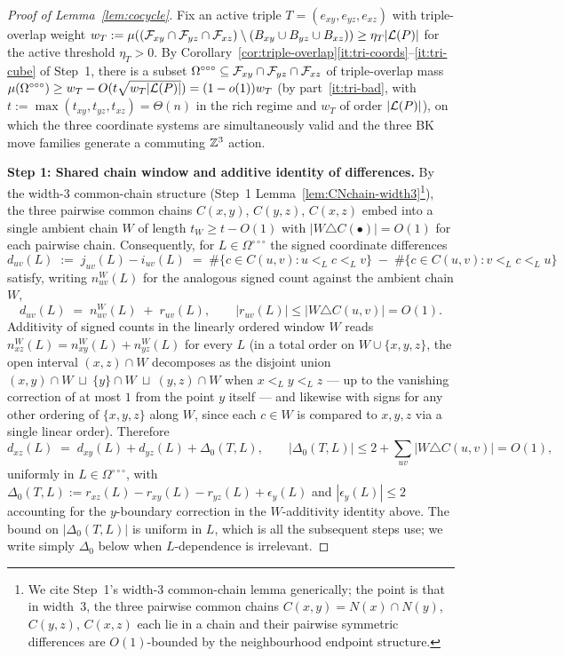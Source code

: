 \begin{proof}[Proof of Lemma~\ref{lem:cocycle}]
Fix an active triple $T=(e_{xy},e_{yz},e_{xz})$ with triple-overlap
weight
$w_T:=\mu((\mathcal{F}_{xy}\cap\mathcal{F}_{yz}\cap\mathcal{F}_{xz})\setminus
(B_{xy}\cup B_{yz}\cup B_{xz}))\ge\eta_T|\mathcal{L}(P)|$ for the active
threshold $\eta_T>0$.  By
Corollary~\ref{cor:triple-overlap}\ref{it:tri-coords}--\ref{it:tri-cube}
of Step~1, there is a subset
$\Omega^{\circ\circ\circ}\subseteq\mathcal{F}_{xy}\cap\mathcal{F}_{yz}\cap\mathcal{F}_{xz}$
of triple-overlap mass
$\mu(\Omega^{\circ\circ\circ})\ge w_T-O(t\sqrt{w_T|\mathcal{L}(P)|})
=(1-o(1))w_T$ (by part~\ref{it:tri-bad}, with
$t:=\max(t_{xy},t_{yz},t_{xz})=\Theta(n)$ in the rich regime and $w_T$
of order $|\mathcal{L}(P)|$), on which the three coordinate systems are
simultaneously valid and the three BK move families generate a
commuting $\mathbb{Z}^3$ action.

\textbf{Step 1: Shared chain window and additive identity of
differences.}
By the width-3 common-chain structure (Step~1
Lemma~\ref{lem:CNchain-width3}\footnote{We cite Step~1's width-3
common-chain lemma generically; the point is that in width~$3$, the
three pairwise common chains $C(x,y)=N(x)\cap N(y)$, $C(y,z)$,
$C(x,z)$ each lie in a chain and their pairwise symmetric differences
are $O(1)$-bounded by the neighbourhood endpoint structure.}), the
three pairwise common chains $C(x,y)$, $C(y,z)$, $C(x,z)$ embed into a
single ambient chain $W$ of length $t_W\ge t-O(1)$ with
$|W\triangle C(\bullet)|=O(1)$ for each pairwise chain.
Consequently, for $L\in\Omega^{\circ\circ\circ}$ the signed coordinate
differences
\[
  d_{uv}(L)\;:=\;j_{uv}(L)-i_{uv}(L)
  \;=\;\#\{c\in C(u,v): u<_L c<_L v\}\;-\;\#\{c\in C(u,v): v<_L c<_L u\}
\]
satisfy, writing $n_{uv}^W(L)$ for the analogous signed count against
the ambient chain $W$,
\[
  d_{uv}(L)\;=\;n_{uv}^W(L)\;+\;r_{uv}(L),
  \qquad |r_{uv}(L)|\le|W\triangle C(u,v)|=O(1).
\]
Additivity of signed counts in the linearly ordered window $W$ reads
$n_{xz}^W(L)=n_{xy}^W(L)+n_{yz}^W(L)$ for every $L$ (in a total order
on $W\cup\{x,y,z\}$, the open interval $(x,z)\cap W$ decomposes as the
disjoint union $(x,y)\cap W\ \sqcup\ \{y\}\cap W\ \sqcup\ (y,z)\cap W$
when $x<_L y<_L z$ --- up to the vanishing correction of at most $1$
from the point $y$ itself --- and likewise with signs for any other
ordering of $\{x,y,z\}$ along $W$, since each $c\in W$ is compared to
$x,y,z$ via a single linear order).  Therefore
\begin{equation}\label{eq:d-triple}
  d_{xz}(L)\;=\;d_{xy}(L)+d_{yz}(L)+\Delta_0(T,L),
  \qquad |\Delta_0(T,L)|\le 2+\sum_{uv}|W\triangle C(u,v)|=O(1),
\end{equation}
uniformly in $L\in\Omega^{\circ\circ\circ}$, with
$\Delta_0(T,L):=r_{xz}(L)-r_{xy}(L)-r_{yz}(L)+\epsilon_y(L)$ and
$|\epsilon_y(L)|\le 2$ accounting for the $y$-boundary correction in
the $W$-additivity identity above.  The bound on $|\Delta_0(T,L)|$ is
uniform in $L$, which is all the subsequent steps use; we write simply
$\Delta_0$ below when $L$-dependence is irrelevant.


\end{proof}
